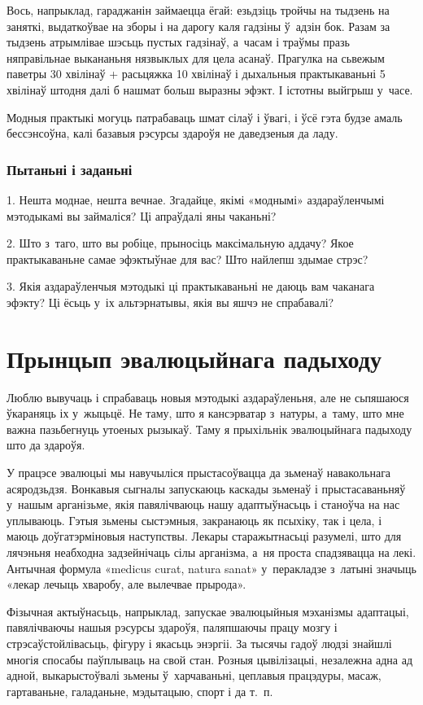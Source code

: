 Вось, напрыклад, гараджанін займаецца ёгай: езьдзіць тройчы на тыдзень на заняткі, выдаткоўвае на зборы і на дарогу каля гадзіны ў~адзін бок. Разам за тыдзень атрымлівае шэсьць пустых гадзінаў, а~часам і траўмы празь няправільнае выкананьня нязвыклых для цела асанаў. Прагулка на сьвежым паветры 30 хвілінаў + расьцяжка 10 хвілінаў і дыхальныя практыкаваньні 5 хвілінаў штодня далі б нашмат больш выразны эфэкт. І істотны выйгрыш у~часе.

Модныя практыкі могуць патрабаваць шмат сілаў і ўвагі, і ўсё гэта будзе амаль бессэнсоўна, калі базавыя рэсурсы здароўя не даведзеныя да ладу.

\subsubsection{Пытаньні і заданьні}

1. Нешта моднае, нешта вечнае. Згадайце, якімі «моднымі» аздараўленчымі мэтодыкамі вы займаліся? Ці апраўдалі яны чаканьні?

2. Што з~таго, што вы робіце, прыносіць максімальную аддачу? Якое практыкаваньне самае эфэктыўнае для вас? Што найлепш здымае стрэс?

3. Якія аздараўленчыя мэтодыкі ці практыкаваньні не даюць вам чаканага эфэкту? Ці ёсьць у~іх альтэрнатывы, якія вы яшчэ не спрабавалі?


\section{Прынцып эвалюцыйнага падыходу}

Люблю вывучаць і спрабаваць новыя мэтодыкі аздараўленьня, але не сьпяшаюся ўкараняць іх у~жыцьцё. Не таму, што я кансэрватар з~натуры, а~таму, што мне важна пазьбегнуць утоеных рызыкаў. Таму я прыхільнік эвалюцыйнага падыходу што да здароўя.

У працэсе эвалюцыі мы навучыліся прыстасоўвацца да зьменаў навакольнага асяродзьдзя. Вонкавыя сыгналы запускаюць каскады зьменаў і прыстасаваньняў у~нашым арганізьме, якія павялічваюць нашу адаптыўнасьць і станоўча на нас уплываюць. Гэтыя зьмены сыстэмныя, закранаюць як псыхіку, так і цела, і маюць доўгатэрміновыя наступствы. Лекары старажытнасьці разумелі, што для лячэньня неабходна задзейнічаць сілы арганізма, а~ня проста спадзявацца на лекі. Антычная формула «medicus curat, natura sanat» у~перакладзе з~латыні значыць «лекар лечыць хваробу, але вылечвае прырода».

Фізычная актыўнасьць, напрыклад, запускае эвалюцыйныя мэханізмы адаптацыі, павялічваючы нашыя рэсурсы здароўя, паляпшаючы працу мозгу і стрэсаўстойлівасьць, фігуру і якасьць энэргіі. За тысячы гадоў людзі знайшлі многія спосабы паўплываць на свой стан. Розныя цывілізацыі, незалежна адна ад адной, выкарыстоўвалі зьмены ў~харчаваньні, цеплавыя працэдуры, масаж, гартаваньне, галаданьне, мэдытацыю, спорт і да т.~п.

